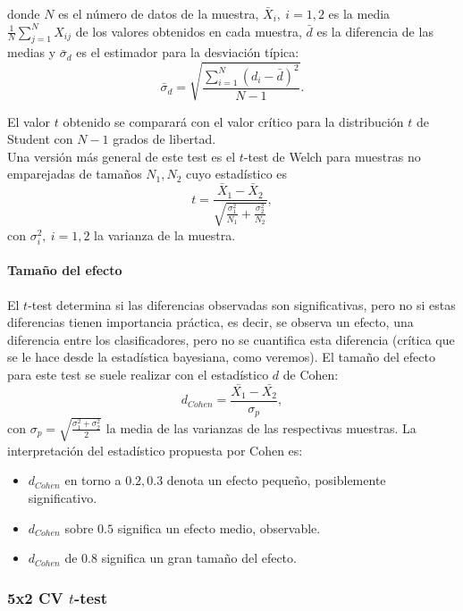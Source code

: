 	donde $N$ es el número de datos de la muestra, 
$\bar{X}_i,\ i=1,2$  es la media $\frac{1}{N}
\sum\limits_{j=1}^{N} X_{ij}$ de los  valores obtenidos en 
cada muestra, $\bar{d}$ es la diferencia de las medias y 
$\bar{\sigma}_d$ es el estimador para la desviación típica:
	\[
		\bar{\sigma}_d =
			\sqrt{
			\frac{\sum\limits_{i=1}^{N} (d_i - \bar{d})^2}
				{N - 1}
			}.
	\]
	
	El valor $t$ obtenido se comparará con el valor crítico
para la distribución $t$ de Student con $N - 1$ 
grados de libertad.\\
	Una versión más general de este test es el $t$-test de
Welch para muestras no emparejadas de tamaños $N_1, N_2$
cuyo estadístico es
	\[
		t = \frac{\bar{X}_1 - \bar{X}_2}
				{\sqrt{ \frac{\sigma_1^2}{N_1} +
						\frac{\sigma_2^2}{N_2}}},
	\]
	con $\sigma_i^2,\ i=1,2$ la varianza de la muestra.
	
\paragraph{Tamaño del efecto} El $t$-test determina si las 
diferencias observadas son significativas, pero no si 
estas diferencias tienen importancia práctica, es decir, 
se observa un efecto, una diferencia entre los 
clasificadores, pero no se cuantifica esta diferencia
(crítica que se le hace desde la estadística bayesiana,
como veremos). El tamaño del efecto para este test se
suele realizar con el estadístico $d$ de Cohen:
	\[
		d_{Cohen} = \frac{\bar{X_1}-\bar{X_2}}
					{\sigma_p},
	\]
	con $\sigma_p = \sqrt{\frac{\sigma_1^2 + \sigma_2^2}{2}}$
la media de las varianzas de las respectivas muestras.
La interpretación del estadístico propuesta por Cohen es:
	\begin{itemize}
	\item $d_{Cohen}$ en torno a $0.2, 0.3$ denota un 
		efecto pequeño, posiblemente significativo.
	\item $d_{Cohen}$ sobre $0.5$ significa un efecto medio,
		observable.
	\item $d_{Cohen}$ de $0.8$ significa un gran tamaño del 
		efecto.
	\end{itemize}
	
\subsubsection{5x2 CV $t$-test}
	
